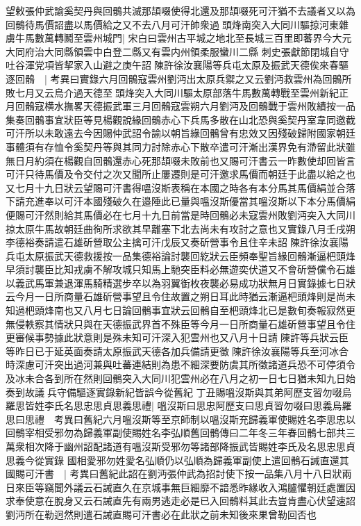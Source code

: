 望敕張仲武諭奚契丹與回鶻共滅那頡啜使得北還及那頡啜死可汗猶不去議者又以為回鶻待馬價詔盡以馬價給之又不去八月可汗帥衆過頭烽南突入大同川驅掠河東雜虜牛馬數萬轉鬭至雲州城門|{
	宋白曰雲州古平城之地北至長城三百里即蕃界今大元大同府治大同縣領雲中白登二縣又有雲内州領柔服蠻川二縣}
刺史張獻節閉城自守吐谷渾党項皆挈家入山避之庚午詔陳許徐汝襄陽等兵屯太原及振武天德俟來春驅逐回鶻　|{
	考異曰實錄六月回鶻寇雲州劉沔出太原兵禦之又云劉沔救雲州為回鶻所敗七月又云烏介過天德至頭烽突入大同川驅太原部落牛馬數萬轉戰至雲州新紀正月回鶻寇横水撫畧天德振武軍三月回鶻寇雲朔六月劉沔及回鶻戰于雲州敗績按一品集奏回鶻事宜狀臣等見楊觀說緣回鶻赤心下兵馬多散在山北恐與奚契丹室韋同邀截可汗所以未敢遠去今因賜仲武詔令諭以朝旨緣回鶻曾有忠效又因殘破歸附國家朝廷事體須有存恤令奚契丹等與其同力討除赤心下散卒遣可汗漸出漢界免有滯留此狀雖無日月約須在楊觀自回鶻還赤心死那頡啜未敗前也又賜可汗書云一昨數使却回皆言可汗只待馬價及令交付之次又聞所止屢遷則是可汗邀求馬價而朝廷于此盡以給之也又七月十九日狀云望賜可汗書得嗢沒斯表稱在本國之時各有本分馬其馬價絹並合落下請充進奉以可汗本國殘破久在邉陲此已量與嗢沒斯優當其嗢沒斯以下本分馬價絹便賜可汗然則給其馬價必在七月十九日前當是時回鶻必未寇雲州敗劉沔突入大同川掠太原牛馬故朝廷曲徇所求欲其早離塞下北去尚未有攻討之意也又實錄八月壬戌朔李德裕奏請遣石雄斫營取公主擒可汗戊辰又奏斫營事令且住辛未詔陳許徐汝襄陽兵屯太原振武天德救援按一品集德裕論討襲回紇狀云臣頻奉聖旨緣回鶻漸逼杷頭烽早須討襲臣比知戎虜不解攻城只知馬上馳突臣料必無遊奕伏道又不會斫營儻令石雄以義武馬軍兼退渾馬騎精選步卒以為羽翼衘枚夜襲必易成功狀無月日實錄據七日狀云今月一日所商量石雄斫營事望且令住故置之朔日耳此時猶云漸逼杷頭烽則是尚未知過杷頭烽南也又八月七日論回鶻事宜狀云回鶻自至杷頭烽北已是數旬奏報寂然更無侵軼察其情狀只與在天德振武界首不殊臣等今月一日所商量石雄斫營事望且令住更審候事勢據此狀意則是殊未知可汗深入犯雲州也又八月十日請陳許等兵狀云臣等昨日已于延英面奏請太原振武天德各加兵備請更徵陳許徐汝襄陽等兵至河冰合時深慮可汗突出過河兼與吐蕃連結則為患不細深要防虞其所徵諸道兵恐不可停須令及冰未合各到所在然則回鶻突入大同川犯雲州必在八月之初一日七日猶未知九日始奏到故議兵守備驅逐實錄新紀皆誤今從舊紀}
丁丑賜嗢沒斯與其弟阿歷支習勿啜烏羅思皆姓李氏名思忠思貞思義思禮|{
	嗢沒斯曰思忠阿歷支曰思貞習勿啜曰思義烏羅思曰思禮　考異曰舊紀六月嗢沒斯等至京師制以嗢沒斯充歸義軍使賜姓名李思忠以回鶻宰相受邪勿為歸義軍副使賜姓名李弘順舊回鶻傳曰二年冬三年春回鶻七部共三萬衆相次降于幽州詔配諸道有嗢沒斯受邪勿等諸部降振武皆賜姓李氏及名思忠思貞思義今從實錄}
國相愛邪勿姓愛名弘順仍以弘順為歸義軍副使上遣回鶻石誡直還其國賜可汗書　|{
	考異曰舊紀此詔在劉沔張仲武為招討使下按一品集八月十八日狀兩日來臣等竊聞外議云石誡直久在京城事無巨細靡不諳悉昨緣收入鴻臚懼朝廷處置因求奉使意在脫身又云石誡直先有兩男逃走必是已入回鶻料其此去豈肯盡心伏望速詔劉沔所在勒迥然則遣石誡直賜可汗書必在此狀之前未知後來果曾勒回否也}

